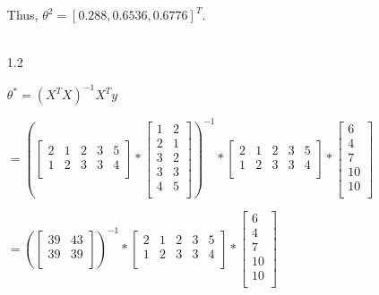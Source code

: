 \documentclass[12pt]{article}
\begin{document}
\begin{enumerate}
  Thus, $\theta^2 = [0.288, 0.6536, 0.6776]^T$. \\ \\

  \item[1.2]

  $\theta^* = (X^T X)^{-1} X^T y$

  $= (\begin{bmatrix}
    2 & 1 & 2 & 3 & 5 \\
    1 & 2 & 3 & 3 & 4 \\
    \end{bmatrix} *
    \begin{bmatrix}
      1 & 2 \\
      2 & 1 \\
      3 & 2 \\
      3 & 3 \\
      4 & 5 \\
    \end{bmatrix})^{-1} *
    \begin{bmatrix}
      2 & 1 & 2 & 3 & 5 \\
      1 & 2 & 3 & 3 & 4 \\
    \end{bmatrix} *
    \begin{bmatrix}
      6 \\
      4 \\
      7 \\
      10 \\
      10 \\
    \end{bmatrix}$

  $= (\begin{bmatrix}
    39 & 43 \\
    39 & 39 \\
    \end{bmatrix})^{-1} *
    \begin{bmatrix}
      2 & 1 & 2 & 3 & 5 \\
      1 & 2 & 3 & 3 & 4 \\
    \end{bmatrix} *
    \begin{bmatrix}
      6 \\
      4 \\
      7 \\
      10 \\
      10 \\
    \end{bmatrix}$


\end{enumerate}
\end{document}
